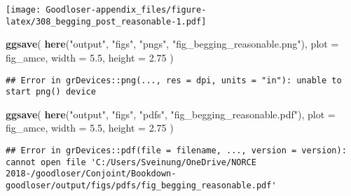 \documentclass[]{book}
\newenvironment{Shaded}{\begin{snugshade}}{\end{snugshade}}
\newcommand{\KeywordTok}[1]{\textcolor[rgb]{0.13,0.29,0.53}{\textbf{#1}}}
\newcommand{\DataTypeTok}[1]{\textcolor[rgb]{0.13,0.29,0.53}{#1}}
\newcommand{\FloatTok}[1]{\textcolor[rgb]{0.00,0.00,0.81}{#1}}
\newcommand{\StringTok}[1]{\textcolor[rgb]{0.31,0.60,0.02}{#1}}
\newcommand{\NormalTok}[1]{#1}
\begin{document}
\texttt{[image: Goodloser-appendix\_files/figure-latex/308\_begging\_post\_reasonable-1.pdf]}

\begin{Shaded}
\begin{Highlighting}[]
\KeywordTok{ggsave}\NormalTok{(}
  \KeywordTok{here}\NormalTok{(}\StringTok{"output"}\NormalTok{, }\StringTok{"figs"}\NormalTok{, }\StringTok{"pngs"}\NormalTok{, }\StringTok{"fig_begging_reasonable.png"}\NormalTok{),}
  \DataTypeTok{plot =}\NormalTok{ fig_amce,}
  \DataTypeTok{width =} \FloatTok{5.5}\NormalTok{, }\DataTypeTok{height =} \FloatTok{2.75}
\NormalTok{)}
\end{Highlighting}
\end{Shaded}

\begin{verbatim}
## Error in grDevices::png(..., res = dpi, units = "in"): unable to start png() device
\end{verbatim}

\begin{Shaded}
\begin{Highlighting}[]
\KeywordTok{ggsave}\NormalTok{(}
  \KeywordTok{here}\NormalTok{(}\StringTok{"output"}\NormalTok{, }\StringTok{"figs"}\NormalTok{, }\StringTok{"pdfs"}\NormalTok{, }\StringTok{"fig_begging_reasonable.pdf"}\NormalTok{),}
  \DataTypeTok{plot =}\NormalTok{ fig_amce,}
  \DataTypeTok{width =} \FloatTok{5.5}\NormalTok{, }\DataTypeTok{height =} \FloatTok{2.75}
\NormalTok{)}
\end{Highlighting}
\end{Shaded}

\begin{verbatim}
## Error in grDevices::pdf(file = filename, ..., version = version): cannot open file 'C:/Users/Sveinung/OneDrive/NORCE 2018-/goodloser/Conjoint/Bookdown-goodloser/output/figs/pdfs/fig_begging_reasonable.pdf'
\end{verbatim}
\end{document}

